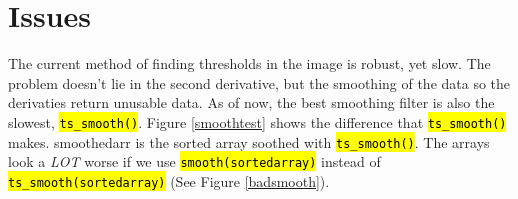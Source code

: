 \documentclass[10pt]{scrartcl}
\begin{document}

\section{Issues} %
\label{sec:issues}
The current method of finding thresholds in the image is robust, yet slow. The problem doesn't lie in the second derivative, but the smoothing of the data so the derivaties return unusable data. As of now, the best smoothing filter is also the slowest, \hl{\texttt{ts\_smooth()}}. Figure \ref{smoothtest} shows the difference that \hl{\texttt{ts\_smooth()}} makes. smoothedarr is the sorted array soothed with \hl{\texttt{ts\_smooth()}}. The arrays look a \emph{LOT} worse if we use \hl{\texttt{smooth(sortedarray)}} instead of \hl{\texttt{ts\_smooth(sortedarray)}} (See Figure \ref{badsmooth}). \\
\end{document}
